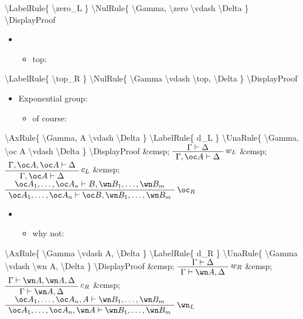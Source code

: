 \textbackslash{}LabelRule\{ \textbackslash{}zero\_L \}
\textbackslash{}NulRule\{ \textbackslash{}Gamma, \textbackslash{}zero
\textbackslash{}vdash \textbackslash{}Delta \}
\textbackslash{}DisplayProof

\begin{itemize}
\item
  \begin{itemize}
  \tightlist
  \item
    top: 
  \end{itemize}
\end{itemize}

\textbackslash{}LabelRule\{ \textbackslash{}top\_R \}
\textbackslash{}NulRule\{ \textbackslash{}Gamma \textbackslash{}vdash
\textbackslash{}top, \textbackslash{}Delta \}
\textbackslash{}DisplayProof

\begin{itemize}
\tightlist
\item
  Exponential group:

  \begin{itemize}
  \tightlist
  \item
    of course: 
  \end{itemize}
\end{itemize}

\textbackslash{}AxRule\{ \textbackslash{}Gamma, A \textbackslash{}vdash
\textbackslash{}Delta \} \textbackslash{}LabelRule\{ d\_L \}
\textbackslash{}UnaRule\{ \textbackslash{}Gamma, \textbackslash{}oc A
\textbackslash{}vdash \textbackslash{}Delta \}
\textbackslash{}DisplayProof \&emsp; \(\AxRule{ \Gamma \vdash \Delta }
\LabelRule{ w_L }
\UnaRule{ \Gamma, \oc A \vdash \Delta }
\DisplayProof\) \&emsp; \(\AxRule{ \Gamma, \oc A, \oc A \vdash \Delta }
\LabelRule{ c_L }
\UnaRule{ \Gamma, \oc A \vdash \Delta }
\DisplayProof\) \&emsp;
\(\AxRule{ \oc A_1, \ldots, \oc A_n \vdash B ,\wn B_1, \ldots, \wn B_m }
\LabelRule{ \oc_R }
\UnaRule{ \oc A_1, \ldots, \oc A_n \vdash \oc B ,\wn B_1, \ldots, \wn B_m }
\DisplayProof\)

\begin{itemize}
\item
  \begin{itemize}
  \tightlist
  \item
    why not: 
  \end{itemize}
\end{itemize}

\textbackslash{}AxRule\{ \textbackslash{}Gamma \textbackslash{}vdash A,
\textbackslash{}Delta \} \textbackslash{}LabelRule\{ d\_R \}
\textbackslash{}UnaRule\{ \textbackslash{}Gamma \textbackslash{}vdash
\textbackslash{}wn A, \textbackslash{}Delta \}
\textbackslash{}DisplayProof \&emsp; \(\AxRule{ \Gamma \vdash \Delta }
\LabelRule{ w_R }
\UnaRule{ \Gamma \vdash \wn A, \Delta }
\DisplayProof\) \&emsp; \(\AxRule{ \Gamma \vdash \wn A, \wn A, \Delta }
\LabelRule{ c_R }
\UnaRule{ \Gamma \vdash \wn A, \Delta }
\DisplayProof\) \&emsp;
\(\AxRule{ \oc A_1, \ldots, \oc A_n, A \vdash \wn B_1, \ldots, \wn B_m }
\LabelRule{ \wn_L }
\UnaRule{ \oc A_1, \ldots, \oc A_n, \wn A \vdash \wn B_1, \ldots, \wn B_m }
\DisplayProof\)

